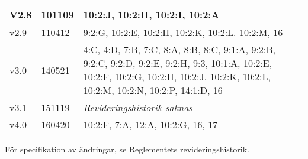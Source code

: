 \documentclass[10pt]{article}
\begin{document}
\begin{center}
\begin{tabular}{| l | l | p{10cm} |}
    \hline
    V2.8 & 101109 & 10:2:J, 10:2:H, 10:2:I, 10:2:A\\
    \hline
    v2.9 & 110412 & 9:2:G, 10:2:E, 10:2:H, 10:2:K, 10:2:L. 10:2:M, 16 \\
    \hline
    v3.0 & 140521 &  4:C, 4:D, 7:B, 7:C, 8:A, 8:B, 8:C, 9:1:A, 9:2:B, 9:2:C, 9:2:D, 9:2:E, 9:2:H, 9:3, 10:1:A, 10:2:E, 10:2:F, 10:2:G, 10:2:H, 10:2:J, 10:2:K, 10:2:L, 10:2:M, 10:2:N, 10:2:P, 14:1:D, 16\\
    \hline
    v3.1 & 151119 & \emph{Revideringshistorik saknas} \\
    \hline
    v4.0 & 160420 & 10:2:F, 7:A, 12:A, 10:2:G, 16, 17 \\
    \hline
\end{tabular}
\end{center}
För specifikation av ändringar, se Reglementets revideringshistorik.
\end{document}
